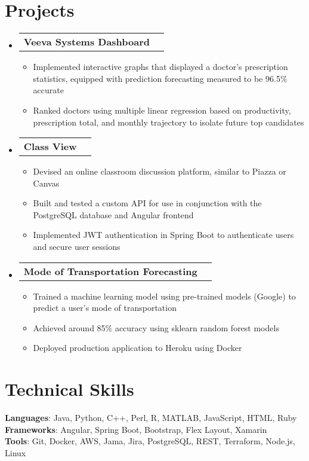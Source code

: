 \documentclass[letterpaper,11pt]{article}
\makeatletter
\newcommand{\resumeItem}[1]{
  \item\small{
    {#1 \vspace{-2pt}}
  }
}
\newcommand{\resumeProjectHeading}[2]{
    \item
    \begin{tabular*}{0.97\textwidth}{l@{\extracolsep{\fill}}r}
      \small#1 & #2 \\
    \end{tabular*}\vspace{-7pt}
}
\newcommand{\resumeSubHeadingListStart}{\begin{itemize}[leftmargin=0.15in, label={}]}
\newcommand{\resumeSubHeadingListEnd}{\end{itemize}}
\newcommand{\resumeItemListStart}{\begin{itemize}}
\newcommand{\resumeItemListEnd}{\end{itemize}\vspace{-5pt}}
\makeatother
\begin{document}
\section{Projects}
    \resumeSubHeadingListStart
      \resumeProjectHeading
          {\textbf{Veeva Systems Dashboard}}{}
          \resumeItemListStart
            \resumeItem{Implemented interactive graphs that displayed a doctor's prescription statistics, equipped with prediction forecasting measured to be 96.5\% accurate}
            \resumeItem{Ranked doctors using multiple linear regression based on productivity, prescription total, and monthly trajectory to isolate future top candidates}
          \resumeItemListEnd
      \resumeProjectHeading
          {\textbf{Class View}}{}
          \resumeItemListStart
            \resumeItem{Devised an online classroom discussion platform, similar to Piazza or Canvas}
            \resumeItem{Built and tested a custom API for use in conjunction with the PostgreSQL database and Angular frontend}
            \resumeItem{Implemented JWT authentication in Spring Boot to authenticate users and secure user sessions}
          \resumeItemListEnd
          \resumeProjectHeading
          {\textbf{Mode of Transportation Forecasting}}{}
          \resumeItemListStart
            \resumeItem{Trained a machine learning model using pre-trained models (Google) to predict a user's mode of transportation}
            \resumeItem{Achieved around 85\% accuracy using sklearn random forest models}
            \resumeItem{Deployed production application to Heroku using Docker}
          \resumeItemListEnd
    \resumeSubHeadingListEnd


%
\section{Technical Skills}
 \begin{itemize}[leftmargin=0.15in, label={}]
    \small{\item{
     \textbf{Languages}{: Java, Python, C++, Perl, R, MATLAB, JavaScript, HTML, Ruby} \\
     \textbf{Frameworks}{: Angular, Spring Boot, Bootstrap, Flex Layout, Xamarin} \\
     \textbf{Tools}{: Git, Docker, AWS, Jama, Jira, PostgreSQL, REST, Terraform, Node.js, Linux}
    }}
 \end{itemize}


\end{document}
